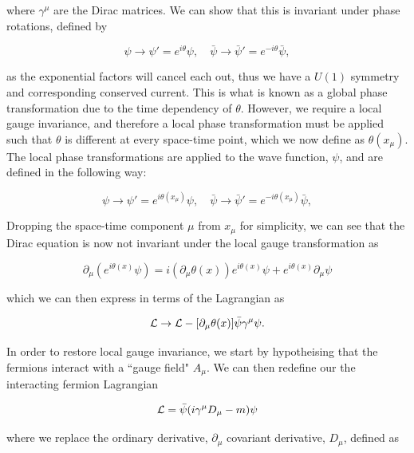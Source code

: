 where $\gamma^{\mu}$ are the Dirac matrices. We can show that this is invariant under phase rotations, defined by

\begin{equation}
\psi \to \psi'= e^{i \theta}\psi, \quad \bar{\psi} \to \bar{\psi}' = e^{- i \theta}\bar{\psi},
\end{equation}

as the exponential factors will cancel each out, thus we have a $U(1)$ symmetry and corresponding conserved current. This is what is known as a global phase transformation due to the time dependency of $\theta$. However, we require a local gauge invariance, and therefore a local phase transformation must be applied such that $\theta$ is different at every space-time point, which we now define as $\theta (x_{\mu})$. The local phase transformations are applied to the wave function, $\psi$, and are defined in the following way:

\begin{equation}
\psi \to \psi'= e^{i \theta(x_{\mu})}\psi, \quad \bar{\psi} \to \bar{\psi}' = e^{- i \theta(x_{\mu})}\bar{\psi},
\end{equation} 

Dropping the space-time component $\mu$ from $x_{\mu}$ for simplicity, we can see that the Dirac equation is now not invariant under the local gauge transformation as

\begin{equation}
\partial_{\mu} (e^{i\theta(x)}\psi) = i(\partial_{\mu}\theta(x))e^{i\theta(x)}\psi + e^{i\theta(x)} \partial_{\mu}\psi 
\end{equation}

which we can then express in terms of the Lagrangian as

\begin{equation}
\mathcal{L} \to \mathcal{L} - [\partial_{\mu} \theta(x)] \bar{\psi} \gamma^{\mu} \psi.
\end{equation}

In order to restore local gauge invariance, we start by hypotheising that the fermions interact with a ``gauge field" $A_{\mu}$. We can then redefine our the interacting fermion Lagrangian 

\begin{equation} \label{eqn-DiracLagrangian}
\mathcal{L} = \bar{\psi}(i \gamma^{\mu}D_{\mu}-m)\psi
\end{equation}

where we replace the ordinary derivative, $\partial_{\mu}$ covariant derivative, $D_{\mu}$, defined as

